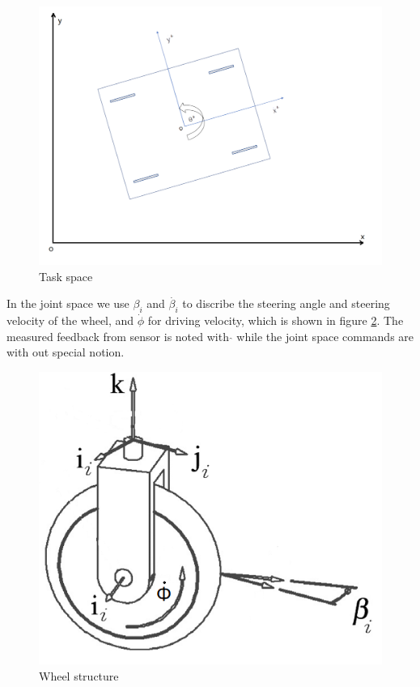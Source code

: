 \begin{figure}[t]
	\begin{center}
	\includegraphics[width=\textwidth]{../Figures/frame.png}
	\caption{Task space}
	\label{fig:taskSpace}
	\end{center}
\end{figure}


In the joint space we use $\beta_{i}$ and $\dot{\beta_{i}}$ to discribe the steering angle and steering velocity of the wheel, and $\dot{\phi}$ for driving velocity, which is shown in figure \cref{fig:wheel}. The measured
feedback from sensor is noted with $\hat{}$ while the joint space commands are with out special notion.

\begin{figure}[t]
\begin{center}
\includegraphics[width=.7\textwidth]{../Figures/wheel.png}
\caption{Wheel structure}
\label{fig:wheel}
\end{center}
\end{figure}

